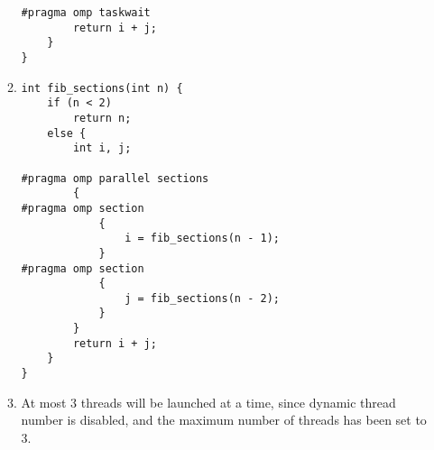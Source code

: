 \documentclass{article}
\begin{document}
\begin{enumerate}
\begin{enumerate}
\begin{verbatim}
#pragma omp taskwait
        return i + j;
    }
}
\end{verbatim}
              \item \begin{verbatim}
int fib_sections(int n) {
    if (n < 2)
        return n;
    else {
        int i, j;

#pragma omp parallel sections
        {
#pragma omp section
            {
                i = fib_sections(n - 1);
            }
#pragma omp section
            {
                j = fib_sections(n - 2);
            }
        }
        return i + j;
    }
}
\end{verbatim}
              \item At most 3 threads will be launched at a time, since dynamic thread number is disabled, and the maximum number of threads has been set to 3.
          \end{enumerate}
\end{enumerate}
\end{document}
